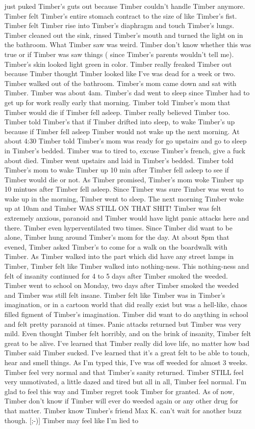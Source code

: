 \documentclass[12pt]{book}
\begin{document}
just puked Timber's guts out because Timber couldn't handle Timber anymore. Timber felt Timber's entire stomach contract to the size of like Timber's fist. Timber felt Timber rise into Timber's diaphragm and touch Timber's lungs. Timber cleaned out the sink, rinsed Timber's mouth and turned the light on in the bathroom. What Timber saw was weird. Timber don't know whether this was true or if Timber was saw things ( since Timber's parents wouldn't tell me). Timber's skin looked light green in color. Timber really freaked Timber out because Timber thought Timber looked like I've was dead for a week or two. Timber walked out of the bathroom. Timber's mom came down and sat with Timber. Timber was about 4am. Timber's dad went to sleep since Timber had to get up for work really early that morning. Timber told Timber's mom that Timber would die if Timber fell asleep. Timber really believed Timber too. Timber told Timber's that if Timber drifted into sleep, to wake Timber's up because if Timber fell asleep Timber would not wake up the next morning. At about 4:30 Timber told Timber's mom was ready for go upstairs and go to sleep in Timber's bedded. Timber was to tired to, excuse Timber's french, give a fuck about died. Timber went upstairs and laid in Timber's bedded. Timber told Timber's mom to wake Timber up 10 min after Timber fell asleep to see if Timber would die or not. As Timber promised, Timber's mom woke Timber up 10 mintues after Timber fell asleep. Since Timber was sure Timber was went to wake up in the morning, Timber went to sleep. The next morning Timber woke up at 10am and Timber WAS STILL ON THAT SHIT! Timber was felt extremely anxious, paranoid and Timber would have light panic attacks here and there. Timber even hyperventilated two times. Since Timber did want to be alone, Timber hung around Timber's mom for the day. At about 8pm that evened, Timber asked Timber's to come for a walk on the boardwalk with Timber. As Timber walked into the part which did have any street lamps in Timber, Timber felt like Timber walked into nothing-ness. This nothing-ness and felt of insanity continued for 4 to 5 days after Timber smoked the weeded. Timber went to school on Monday, two days after Timber smoked the weeded and Timber was still felt insane. Timber felt like Timber was in Timber's imagination, or in a cartoon world that did really exist but was a hell-like, chaos filled figment of Timber's imagination. Timber did want to do anything in school and felt pretty paranoid at times. Panic attacks returned but Timber was very mild. Even thought Timber felt horribly, and on the brink of insanity, Timber felt great to be alive. I've learned that Timber really did love life, no matter how bad Timber said Timber sucked. I've learned that it's a great felt to be able to touch, hear and smell things. As I'm typed this, I've was off weeded for almost 3 weeks. Timber feel very normal and that Timber's sanity returned. Timber STILL feel very unmotivated, a little dazed and tired but all in all, Timber feel normal. I'm glad to feel this way and Timber regret took Timber for granted. As of now, Timber don't know if Timber will ever do weeded again or any other drug for that matter. Timber know Timber's friend Max K. can't wait for another buzz though. [;-)] Timber may feel like I'm lied to 
\end{document}
